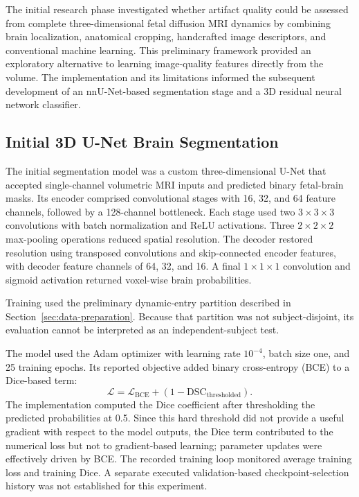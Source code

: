 The initial research phase investigated whether artifact quality could be assessed from complete three-dimensional fetal diffusion MRI dynamics by combining brain localization, anatomical cropping, handcrafted image descriptors, and conventional machine learning. This preliminary framework provided an exploratory alternative to learning image-quality features directly from the volume. The implementation and its limitations informed the subsequent development of an nnU-Net-based segmentation stage and a 3D residual neural network classifier.

\subsection{Initial 3D U-Net Brain Segmentation}
\label{subsec:initial_3d_unet}

The initial segmentation model was a custom three-dimensional U-Net that accepted single-channel volumetric MRI inputs and predicted binary fetal-brain masks. Its encoder comprised convolutional stages with 16, 32, and 64 feature channels, followed by a 128-channel bottleneck. Each stage used two $3\times3\times3$ convolutions with batch normalization and ReLU activations. Three $2\times2\times2$ max-pooling operations reduced spatial resolution. The decoder restored resolution using transposed convolutions and skip-connected encoder features, with decoder feature channels of 64, 32, and 16. A final $1\times1\times1$ convolution and sigmoid activation returned voxel-wise brain probabilities.

Training used the preliminary dynamic-entry partition described in Section~\ref{sec:data-preparation}. Because that partition was not subject-disjoint, its evaluation cannot be interpreted as an independent-subject test.

The model used the Adam optimizer with learning rate $10^{-4}$, batch size one, and 25 training epochs. Its reported objective added binary cross-entropy (BCE) to a Dice-based term:
\begin{equation}
\mathcal{L}=\mathcal{L}_{\mathrm{BCE}}+(1-\mathrm{DSC}_{\mathrm{thresholded}}).
\end{equation}
The implementation computed the Dice coefficient after thresholding the predicted probabilities at 0.5. Since this hard threshold did not provide a useful gradient with respect to the model outputs, the Dice term contributed to the numerical loss but not to gradient-based learning; parameter updates were effectively driven by BCE. The recorded training loop monitored average training loss and training Dice. A separate executed validation-based checkpoint-selection history was not established for this experiment.

